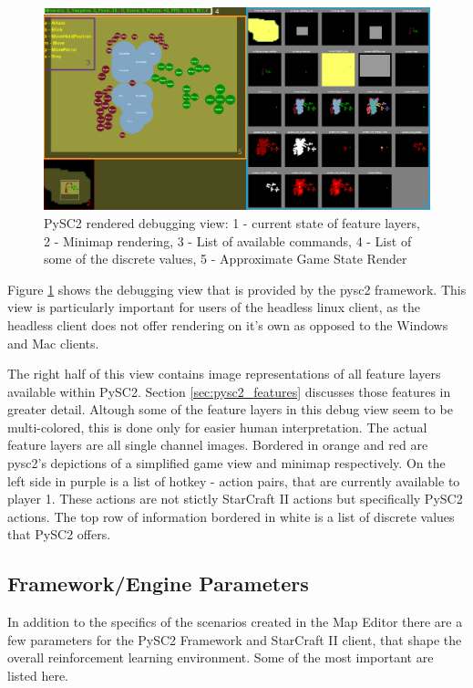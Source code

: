 \begin{figure}[htb]
  \centering
      \includegraphics[width=1\textwidth]{Figures/pysc2_borders.png}
  \caption{PySC2 rendered debugging view: 1 - current state of feature layers, 2 - Minimap rendering, 3 - List of available commands, 4 - List of some of the discrete values, 5 - Approximate Game State Render}
  \label{fig:pysc2_render}
\end{figure}
Figure \ref{fig:pysc2_render} shows the debugging view that is provided by the pysc2 framework. This view is particularly important for users of the headless linux client, as the headless client does not offer rendering on it's own as opposed to the Windows and Mac clients.

The right half of this view contains image representations of all feature layers available within PySC2. Section \ref{sec:pysc2_features} discusses those features in greater detail. Altough some of the feature layers in this debug view seem to be multi-colored, this is done only for easier human interpretation. The actual feature layers are all single channel images. Bordered in orange and red are pysc2's depictions of a simplified game view and minimap respectively. On the left side in purple is a list of hotkey - action pairs, that are currently available to player 1. These actions are not stictly StarCraft II actions but specifically PySC2 actions. The top row of information bordered in white is a list of discrete values that PySC2 offers.


\newpage
\subsection{Framework/Engine Parameters}
\label{sec:engparam}
In addition to the specifics of the scenarios created in the Map Editor there are a few parameters for the PySC2 Framework and StarCraft II client, that shape the overall reinforcement learning environment.
Some of the most important are listed here. 

